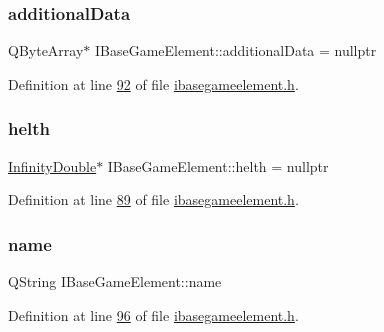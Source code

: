 \subsubsection{\texorpdfstring{additional\+Data}{additionalData}}
{\footnotesize\ttfamily Q\+Byte\+Array$\ast$ I\+Base\+Game\+Element\+::additional\+Data = nullptr\hspace{0.3cm}{\ttfamily [protected]}}



Definition at line \hyperlink{a00047_source_l00092}{92} of file \hyperlink{a00047_source}{ibasegameelement.\+h}.

\mbox{\label{a00137_a440cf9e7d61c33482ab256a6e944b34d}} 
\subsubsection{\texorpdfstring{helth}{helth}}
{\footnotesize\ttfamily \hyperlink{a00161}{Infinity\+Double}$\ast$ I\+Base\+Game\+Element\+::helth = nullptr\hspace{0.3cm}{\ttfamily [protected]}}



Definition at line \hyperlink{a00047_source_l00089}{89} of file \hyperlink{a00047_source}{ibasegameelement.\+h}.

\mbox{\label{a00137_af35fba4ed599605c3d78b3c3a71fa467}} 
\subsubsection{\texorpdfstring{name}{name}}
{\footnotesize\ttfamily Q\+String I\+Base\+Game\+Element\+::name\hspace{0.3cm}{\ttfamily [protected]}}



Definition at line \hyperlink{a00047_source_l00096}{96} of file \hyperlink{a00047_source}{ibasegameelement.\+h}.

\mbox{\label{a00137_afe080b1942ec40832e94cb884ec87456}} 
